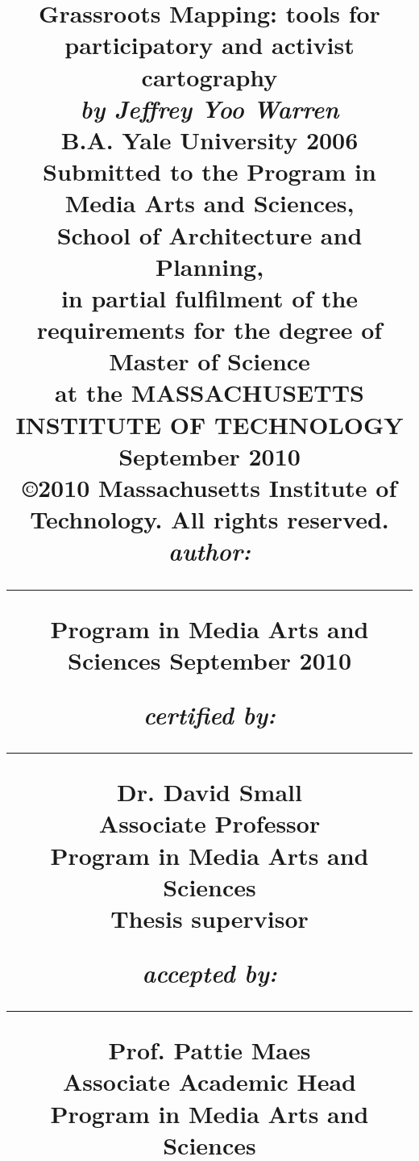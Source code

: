 \documentclass[11pt,oneside,notitlepage]{report}
\begin{document}



\title{\begin{flushleft}\vspace{-40px}
Grassroots Mapping: tools for participatory and activist cartography\\ \vspace{10px}
\emph{by Jeffrey Yoo Warren}\\ \vspace{10px}
\large{B.A. Yale University 2006}\\ \vspace{30px}
\large{Submitted to the Program in Media Arts and Sciences,\\
School of Architecture and Planning,\\
in partial fulfilment of the requirements for the degree of\\
Master of Science\\
at the {\sc MASSACHUSETTS INSTITUTE OF TECHNOLOGY}\\
September 2010\\ 
\copyright 2010 Massachusetts Institute of Technology. All rights reserved.}\\
\vspace{30px}
\large{\emph{author: }}\\ \vspace{2px}
\hrule \vspace{10px}
\begin{flushright}
Program in Media Arts and Sciences
September 2010
\end{flushright}
\vspace{10px}
\large{\emph{certified by: }}\\ 
\hrule \vspace{10px}
\begin{flushright}
Dr. David Small\\
Associate Professor\\
Program in Media Arts and Sciences\\
Thesis supervisor
\end{flushright}
\vspace{10px}
\large{\emph{accepted by: }}\\
\hrule \vspace{10px}
\begin{flushright}
Prof. Pattie Maes\\
Associate Academic Head\\
Program in Media Arts and Sciences\\
\end{flushright}
\end{flushleft}}
\date{}
\author{
}
\maketitle
\end{document}
